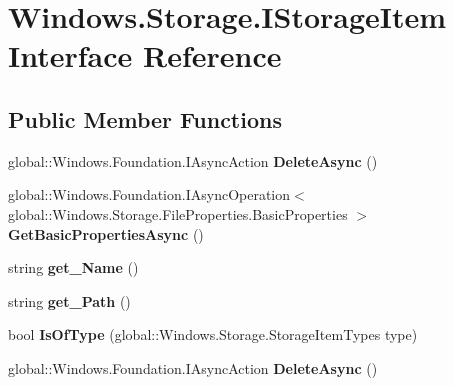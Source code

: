 \hypertarget{interface_windows_1_1_storage_1_1_i_storage_item}{}\section{Windows.\+Storage.\+I\+Storage\+Item Interface Reference}
\label{interface_windows_1_1_storage_1_1_i_storage_item}
\subsection*{Public Member Functions}
\begin{DoxyCompactItemize}
\item 
\mbox{\label{interface_windows_1_1_storage_1_1_i_storage_item_a7268ae5d814924d40bb95256c8bc9e23}} 
global\+::\+Windows.\+Foundation.\+I\+Async\+Action {\bfseries Delete\+Async} ()
\item 
\mbox{\label{interface_windows_1_1_storage_1_1_i_storage_item_a83642e3d152b180ace955ef374a5aad3}} 
global\+::\+Windows.\+Foundation.\+I\+Async\+Operation$<$ global\+::\+Windows.\+Storage.\+File\+Properties.\+Basic\+Properties $>$ {\bfseries Get\+Basic\+Properties\+Async} ()
\item 
\mbox{\label{interface_windows_1_1_storage_1_1_i_storage_item_a484400e7992b97add1f16fb9c1bee73a}} 
string {\bfseries get\+\_\+\+Name} ()
\item 
\mbox{\label{interface_windows_1_1_storage_1_1_i_storage_item_ae2665e5bf45bb4d62bf1434aa468f431}} 
string {\bfseries get\+\_\+\+Path} ()
\item 
\mbox{\label{interface_windows_1_1_storage_1_1_i_storage_item_a57853bba9d58c4b071bb217028afe56f}} 
bool {\bfseries Is\+Of\+Type} (global\+::\+Windows.\+Storage.\+Storage\+Item\+Types type)
\item 
\mbox{\label{interface_windows_1_1_storage_1_1_i_storage_item_a7268ae5d814924d40bb95256c8bc9e23}} 
global\+::\+Windows.\+Foundation.\+I\+Async\+Action {\bfseries Delete\+Async} ()

\end{DoxyCompactItemize}
